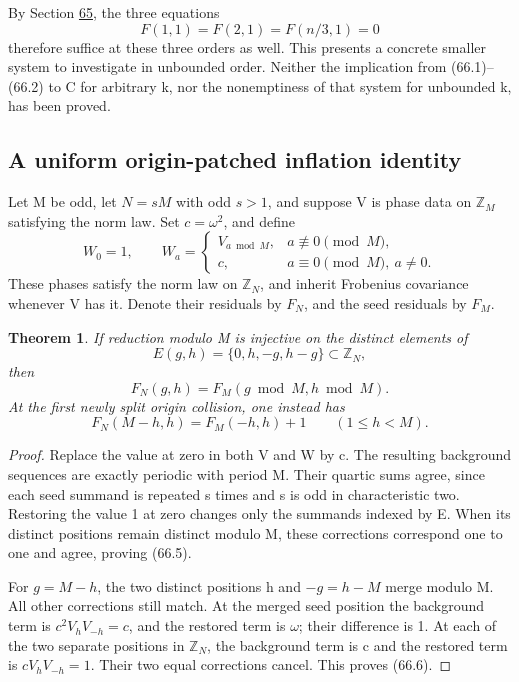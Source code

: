 \documentclass[11pt,reqno]{amsart}
\theoremstyle{plain}
\newtheorem{theorem}{Theorem}[section]
\begin{document}
By Section \hyperref[sec:65]{65}, the three equations
\begin{equation*}
 F(1,1)=F(2,1)=F(n/3,1)=0
 \tag{66.3}
\end{equation*}
therefore suffice at these three orders as well. This presents a
concrete smaller system to investigate in unbounded order. Neither
the implication from (66.1)--(66.2) to C for arbitrary k, nor the
nonemptiness of that system for unbounded k, has been proved.

\subsection{A uniform origin-patched inflation identity}\label{sec:66.2}

Let M be odd, let \(N=sM\) with odd \(s>1\), and suppose V
is phase data on \(\mathbb Z_M\) satisfying the norm law.
Set \(c=\omega^2\), and define
\begin{equation*}
 W_0=1,\qquad
 W_a=\begin{cases}
       V_{a\bmod M},&a\not\equiv0\pmod M,\\
       c,&a\equiv0\pmod M,\ a\ne0.
      \end{cases}
 \tag{66.4}
\end{equation*}
These phases satisfy the norm law on \(\mathbb Z_N\), and inherit
Frobenius covariance whenever V has it. Denote their residuals by
\(F_N\), and the seed residuals by \(F_M\).

\begin{theorem}
If reduction modulo M is injective on the distinct
elements of
\[
 E(g,h)=\{0,h,-g,h-g\}\subset\mathbb Z_N,
\]
then
\begin{equation*}
 F_N(g,h)=F_M(g\bmod M,h\bmod M).
 \tag{66.5}
\end{equation*}
At the first newly split origin collision, one instead has
\begin{equation*}
 \boxed{F_N(M-h,h)=F_M(-h,h)+1}
 \qquad(1\le h<M).
 \tag{66.6}
\end{equation*}
\end{theorem}

\begin{proof}
Replace the value at zero in both V and W by c. The
resulting background sequences are exactly periodic with period M.
Their quartic sums agree, since each seed summand is repeated s
times and s is odd in characteristic two. Restoring the value 1 at
zero changes only the summands indexed by E. When its distinct
positions remain distinct modulo M, these corrections correspond
one to one and agree, proving (66.5).

For \(g=M-h\), the two distinct positions h and \(-g=h-M\)
merge modulo M. All other corrections still match. At the merged
seed position the background term is
\(c^2V_hV_{-h}=c\), and the restored term is \(\omega\);
their difference is 1. At each of the two separate positions in
\(\mathbb Z_N\), the background term is c and the restored
term is \(cV_hV_{-h}=1\). Their two equal corrections cancel.
This proves (66.6).
\end{proof}
\end{document}
